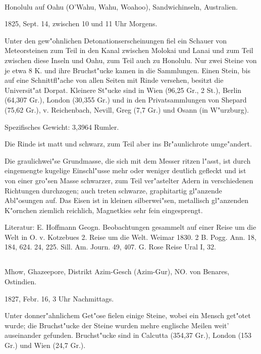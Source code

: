 \documentclass[a4paper, 11pt, oneside]{article}
\begin{document}
\paragraph{}
Honolulu auf Oahu (O'Wahu, Wahu, Woahoo), Sandwichinseln, Australien.

1825, Sept. 14, zwischen 10 und 11 Uhr Morgens.

Unter den gew"ohnlichen Detonationserscheinungen fiel ein Schauer von Meteorsteinen zum Teil in den Kanal zwischen Molokai und Lanai und zum Teil zwischen diese Inseln und Oahu, zum Teil auch zu Honolulu. Nur zwei Steine von je etwa 8 K. und ihre Bruchst"ucke kamen in die Sammlungen. Einen Stein, bis auf eine Schnittfl"ache von allen Seiten mit Rinde versehen, besitzt die Universit"at Dorpat. Kleinere St"ucke sind in Wien (96,25 Gr., 2 St.), Berlin (64,307 Gr.), London (30,355 Gr.) und in den Privatsammlungen von Shepard (75,62 Gr.), v. Reichenbach, Nevill, Greg (7,7 Gr.) und Osann (in W"urzburg).

Spezifisches Gewicht: 3,3964 Rumler.

Die Rinde ist matt und schwarz, zum Teil aber ins Br"aunlichrote umge"andert.

Die graulichwei"se Grundmasse, die sich mit dem Messer ritzen l"asst, ist durch eingemengte kugelige Einschl"usse mehr oder weniger deutlich gefleckt und ist von einer gro"sen Masse schwarzer, zum Teil ver"astelter Adern in verschiedenen Richtungen durchzogen; auch treten schwarze, graphitartig gl"anzende Abl"osungen auf. Das Eisen ist in kleinen silberwei"sen, metallisch gl"anzenden K"ornchen ziemlich reichlich, Magnetkies sehr fein eingesprengt.

\normalsize
Literatur: E. Hoffmann Geogn. Beobachtungen gesammelt auf einer Reise um die Welt in O. v. Kotzebues 2. Reise um die Welt. Weimar 1830. 2 B. Pogg. Ann. 18, 184, 624. 24, 225. Sill. Am. Journ. 49, 407. G. Rose Reise Ural I, 32.

\subsection{}
\LARGE
\paragraph{}
Mhow, Ghazeepore, Distrikt Azim-Gesch (Azim-Gur), NO. von Benares, Ostindien.

1827, Febr. 16, 3 Uhr Nachmittags.

Unter donner"ahnlichem Get"ose fielen einige Steine, wobei ein Mensch get"otet wurde; die Bruchst"ucke der Steine wurden mehre englische Meilen weit' auseinander gefunden. Bruchst"ucke sind in Calcutta (354,37 Gr.), London (153 Gr.) und Wien (24,7 Gr.).
\end{document}
